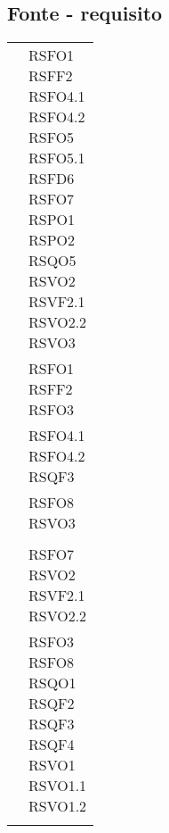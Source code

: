 {{{{\subsection{Fonte - requisito}\label{RequisitiTracciamentoDeiRequisitiFonteRequisito}
\def\tabularxcolumn#1{m{#1}}
{
	\begin{center}
		\renewcommand{\arraystretch}{1.4}
		\begin{longtable}{|p{7.5cm}|p{7.5cm}|}
		\hline
		\rowcolor{airforceblue}
		\makecell[c]{\textbf{Fonte}} & \makecell[c]{\textbf{Codice RS}}  \\
		\hline
		\makecell[c]{Capitolato} & \makecell[c]{RSFO1\\RSFF2\\RSFO4.1\\RSFO4.2\\RSFO5\\RSFO5.1\\RSFD6\\RSFO7\\RSPO1\\RSPO2\\RSQO5\\RSVO2\\RSVF2.1\\RSVO2.2\\RSVO3} \\
		\hline
		\makecell[c]{FC1.1} & \makecell[c]{RSFO1 \\ RSFF2 \\ RSFO3} \\
		\hline
		\makecell[c]{FC1.2} & \makecell[c]{RSFO4.1 \\ RSFO4.2 \\ RSQF3} \\
		\hline
		\makecell[c]{FC1.3} & \makecell[c]{RSFO8 \\ RSVO3} \\ 
		\hline
		\makecell[c]{FC2} & \makecell[c]{RSFD6} \\ 
		\hline
		\makecell[c]{FC3.1} & \makecell[c]{RSFO7 \\ RSVO2\\RSVF2.1\\RSVO2.2} \\
		\hline
		\makecell[c]{Interno} &\makecell[c]{RSFO3\\RSFO8\\RSQO1\\RSQF2\\RSQF3\\RSQF4\\RSVO1\\RSVO1.1\\RSVO1.2} \\
		\hline
		\makecell[c]{Verbale esterno 17-12-2020} & \makecell[c]{RSFO1} \\
		\hline
	\end{longtable}
\end{center}

}}}}}
